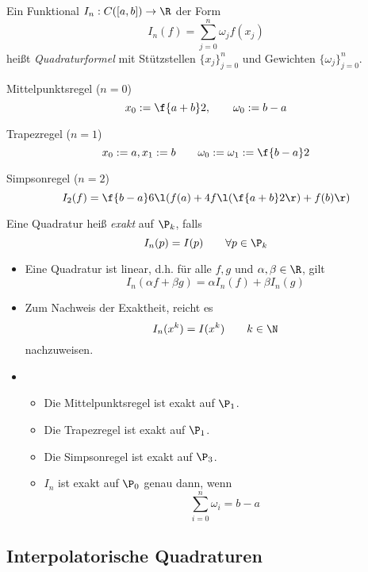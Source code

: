 \documentclass[11pt]{scrartcl}
\begin{document}
\begin{df}[Quadratur]
	\label{2.1}
	Ein Funktional $I_n : C([a,b]) \to \R$ der Form
	\[
		I_n(f) = \sum_{j=0}^n \omega_j f(x_j)
	\]
	heißt \emph{Quadraturformel} mit Stützstellen $\{x_j\}_{j=0}^n$ und Gewichten $\{\omega_j\}_{j=0}^n$.
\end{df}

\begin{ex*}
	\begin{seg}{Mittelpunktsregel ($n=0$)}
		\[
			x_0 := \f {a+b}2, \qquad \omega_0 := b-a
		\]				
	\end{seg}
	\begin{seg}{Trapezregel ($n=1$)}
		\[
			x_0 := a, x_1 := b \qquad \omega_0 := \omega_1 := \f {b-a}2
		\]				
	\end{seg}
	\begin{seg}{Simpsonregel ($n=2$)}
		\[
			I_2(f) = \f {b-a}6 \l( f(a) + 4f\l(\f {a+b}2\r) + f(b) \r)
		\]
	\end{seg}
\end{ex*}

\begin{df}[Exaktheit]
	\label{2.2}
	Eine Quadratur heiß \emph{exakt} auf $\P_k$, falls
	\[
		I_n(p) = I(p) \qquad \forall p\in \P_k
	\]
\end{df}

\begin{nt*}
	\begin{itemize}
		\item
			Eine Quadratur ist linear, d.h. für alle $f,g$ und $\alpha,\beta \in \R$, gilt
			\[
				I_n ( \alpha f + \beta g) = \alpha I_n(f) + \beta I_n(g)
			\]
		\item
			Zum Nachweis der Exaktheit, reicht es
			\[
				I_n(x^k) = I(x^k) \qquad k\in \N
			\]
			nachzuweisen.
		\item
			\begin{itemize}
				\item
					Die Mittelpunktsregel ist exakt auf $\P_1$.
				\item
					Die Trapezregel ist exakt auf $\P_1$.
				\item
					Die Simpsonregel ist exakt auf $\P_3$.
				\item
					$I_n$ ist exakt auf $\P_0$ genau dann, wenn
					\[
						\sum_{i=0}^n \omega_i = b-a
					\]
			\end{itemize}
	\end{itemize}
\end{nt*}


\subsection{Interpolatorische Quadraturen}
\end{document}
